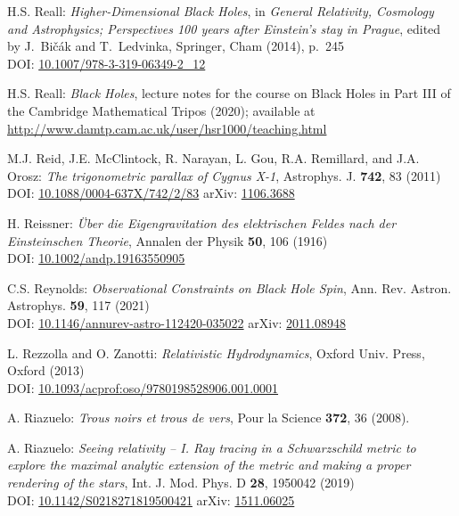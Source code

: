 \begin{thebibliography}{123}
H.S. Reall:
{\em Higher-Dimensional Black Holes},
in {\em  General Relativity, Cosmology and Astrophysics; Perspectives 100 years after Einstein's stay in Prague}, edited by J.~Bičák and T.~Ledvinka,
Springer, Cham (2014), p.~245\\
DOI: \href{https://doi.org/10.1007/978-3-319-06349-2_12}{10.1007/978-3-319-06349-2\_12}

H.S. Reall: {\em Black Holes}, lecture notes for the course on Black Holes in
Part III of the Cambridge Mathematical Tripos (2020); available at\\
\url{http://www.damtp.cam.ac.uk/user/hsr1000/teaching.html}

M.J. Reid, J.E. McClintock, R. Narayan, L. Gou, R.A. Remillard, and J.A. Orosz:
{\em The trigonometric parallax of Cygnus X-1},
Astrophys. J. {\bf 742}, 83 (2011)\\
DOI: \href{https://doi.org/10.1088/0004-637X/742/2/83}{10.1088/0004-637X/742/2/83}\hfill
arXiv: \href{https://arxiv.org/abs/1106.3688}{1106.3688}

H. Reissner:
{\em Über die Eigengravitation des elektrischen Feldes nach der Einsteinschen Theorie},
Annalen der Physik {\bf 50}, 106 (1916)\\
DOI: \href{https://doi.org/10.1002/andp.19163550905}{10.1002/andp.19163550905}

C.S. Reynolds:
{\em Observational Constraints on Black Hole Spin},
Ann. Rev. Astron. Astrophys. {\bf 59}, 117 (2021)\\
DOI:  \href{https://doi.org/10.1146/annurev-astro-112420-035022}{10.1146/annurev-astro-112420-035022}\hfill
arXiv: \href{https://arxiv.org/abs/2011.08948}{2011.08948}

L. Rezzolla and O. Zanotti:
{\em Relativistic Hydrodynamics},
Oxford Univ. Press, Oxford (2013)\\
DOI: \href{https://doi.org/10.1093/acprof:oso/9780198528906.001.0001}{10.1093/acprof:oso/9780198528906.001.0001}

A. Riazuelo:
{\em Trous noirs et trous de vers},
Pour la Science {\bf 372}, 36 (2008).

A. Riazuelo:
{\em Seeing relativity -- I. Ray tracing in a Schwarzschild metric to explore the maximal analytic extension of the metric and making a proper rendering of the stars},
Int. J. Mod. Phys. D {\bf 28}, 1950042 (2019)\\
DOI: \href{https://doi.org/10.1142/S0218271819500421}{10.1142/S0218271819500421}
\hfill
arXiv: \href{https://arxiv.org/abs/1511.06025}{1511.06025}


\end{thebibliography}
